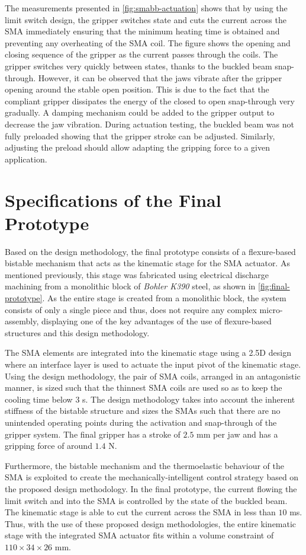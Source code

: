 The measurements presented in \cref{fig:smabb-actuation} shows that by using the limit switch design, the gripper switches state and cuts the current across the SMA immediately ensuring that the minimum heating time is obtained and preventing any overheating of the SMA coil. The figure shows the opening and closing sequence of the gripper as the current passes through the coils. The gripper switches very quickly between states, thanks to the buckled beam snap-through. However, it can be observed that the jaws vibrate after the gripper opening around the stable open position. This is due to the fact that the compliant gripper dissipates the energy of the closed to open snap-through very gradually. A damping mechanism could be added to the gripper output to decrease the jaw vibration. During actuation testing, the buckled beam was not fully preloaded showing that the gripper stroke can be adjusted. Similarly, adjusting the preload should allow adapting the gripping force to a given application.

\section{Specifications of the Final Prototype}
Based on the design methodology, the final prototype consists of a flexure-based bistable mechanism that acts as the kinematic stage for the SMA actuator. As mentioned previously, this stage was fabricated using electrical discharge machining from a monolithic block of \textit{Bohler K390} steel, as shown in \cref{fig:final-prototype}. As the entire stage is created from a monolithic block, the system consists of only a single piece and thus, does not require any complex micro-assembly, displaying one of the key advantages of the use of flexure-based structures and this design methodology.

The SMA elements are integrated into the kinematic stage using a 2.5D design where an interface layer is used to actuate the input pivot of the kinematic stage. Using the design methodology, the pair of SMA coils, arranged in an antagonistic manner, is sized such that the thinnest SMA coils are used so as to keep the cooling time below $3$ s. The design methodology takes into account the inherent stiffness of the bistable structure and sizes the SMAs such that there are no unintended operating points during the activation and snap-through of the gripper system. The final gripper has a stroke of $2.5$ mm per jaw and has a gripping force of around $1.4$ N.

Furthermore, the bistable mechanism and the thermoelastic behaviour of the SMA is exploited to create the mechanically-intelligent control strategy based on the proposed design methodology. In the final prototype, the current flowing the limit switch and into the SMA is controlled by the state of the buckled beam. The kinematic stage is able to cut the current across the SMA in less than $10$ ms. Thus, with the use of these proposed design methodologies, the entire kinematic stage with the integrated SMA actuator fits within a volume constraint of $110 \times 34 \times 26$ mm.


